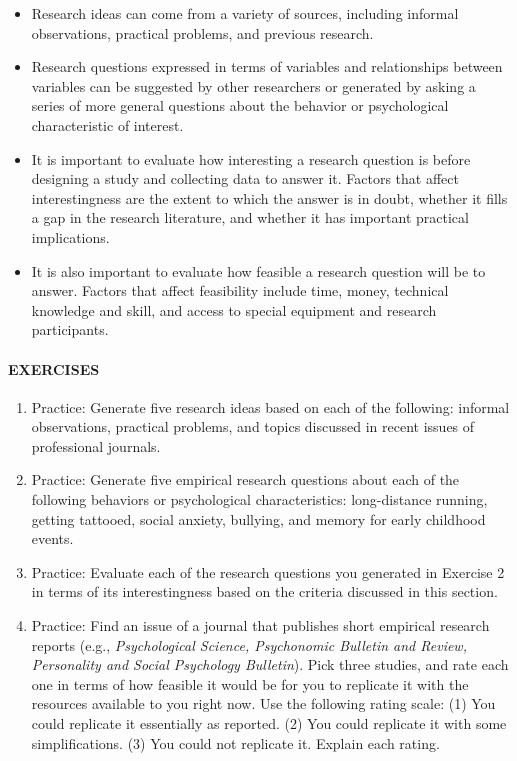 \documentclass[
]{krantz}
\providecommand{\tightlist}{%
  \setlength{\itemsep}{0pt}\setlength{\parskip}{0pt}}
\begin{document}
\begin{itemize}
\tightlist
\item
  Research ideas can come from a variety of sources, including informal observations, practical problems, and previous research.
\item
  Research questions expressed in terms of variables and relationships between variables can be suggested by other researchers or generated by asking a series of more general questions about the behavior or psychological characteristic of interest.
\item
  It is important to evaluate how interesting a research question is before designing a study and collecting data to answer it. Factors that affect interestingness are the extent to which the answer is in doubt, whether it fills a gap in the research literature, and whether it has important practical implications.
\item
  It is also important to evaluate how feasible a research question will be to answer. Factors that affect feasibility include time, money, technical knowledge and skill, and access to special equipment and research participants.
\end{itemize}

\hypertarget{exercises-25}{%
\paragraph*{EXERCISES}\label{exercises-25}}

\begin{enumerate}
\def\labelenumi{\arabic{enumi}.}
\tightlist
\item
  Practice: Generate five research ideas based on each of the following: informal observations, practical problems, and topics discussed in recent issues of professional journals.
\item
  Practice: Generate five empirical research questions about each of the following behaviors or psychological characteristics: long-distance running, getting tattooed, social anxiety, bullying, and memory for early childhood events.
\item
  Practice: Evaluate each of the research questions you generated in Exercise 2 in terms of its interestingness based on the criteria discussed in this section.
\item
  Practice: Find an issue of a journal that publishes short empirical research reports (e.g., \emph{Psychological Science, Psychonomic Bulletin and Review, Personality and Social Psychology Bulletin}). Pick three studies, and rate each one in terms of how feasible it would be for you to replicate it with the resources available to you right now. Use the following rating scale: (1) You could replicate it essentially as reported. (2) You could replicate it with some simplifications. (3) You could not replicate it. Explain each rating.
\end{enumerate}
\end{document}
